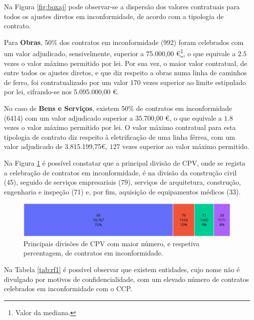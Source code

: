 Na Figura \ref{fig:boxaj} pode observar-se a dispersão dos valores contratuais para todos os ajustes diretos em inconformidade, de acordo com a tipologia de contrato.

Para \textbf{Obras}, 50\% dos contratos em inconformidade (992) foram celebrados com um valor adjudicado, sensivelmente, superior a 75.000,00 €\footnote{Valor da mediana.}, o que equivale a $2.5$ vezes o valor máximo permitido por lei. Por sua vez, o maior valor contratual, de entre todos os ajustes diretos, e que diz respeito a obras numa linha de caminhos de ferro, foi contratualizado por um valor 170 vezes superior ao limite estipulado por lei, cifrando-se nos 5.095.000,00 €.

No caso de \textbf{Bens e Serviços}, existem 50\% de contratos em inconformidade (6414) com um valor adjudicado superior a 35.700,00 €, o que equivale a $1.8$ vezes o valor máximo permitido por lei. O valor máximo contratual para esta tipologia de contrato diz respeito à eletrificação de uma linha férrea, com um valor adjudicado de 3.815.199,75€, $127$ vezes superior ao valor máximo permitido.


Na Figura \ref{fig:maincpvsaj} é possível constatar que a principal divisão de CPV, onde se regista a celebração de contratos em inconformidade, é na divisão da construção civil (45), seguido de serviços empresariais (79), serviços de arquitetura, construção, engenharia e inspeção (71) e, por fim, aquisição de equipamentos médicos (33).

\begin{figure}[H]
	\centering
	\includegraphics[width=\textwidth]{imagens/rf1/maincpvs.png}
	\caption{Principais divisões de CPV com maior número, e respetiva percentagem, de contratos em inconformidade.}
	\label{fig:maincpvsaj}
\end{figure}


Na Tabela \ref{tab:rf1} é possível observar que existem entidades, cujo nome não é divulgado por motivos de confidencialidade, com um elevado número de contratos celebrados em inconformidade com o CCP. 

